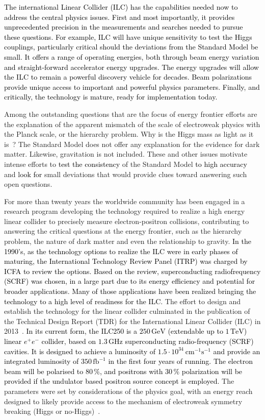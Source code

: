 \documentclass[%
 reprint,
 amsmath,amssymb,
 aps,
]{revtex4-1}
\newcommand{\juan}[1]{\textcolor{black}{{#1}}}
\newcommand{\jim}[1]{\textcolor{black}{#1}}
\begin{document}
\jim{The international Linear Collider (ILC) has the capabilities needed now to address the central physics issues. 
First and most importantly, it provides unprecedented precision 
in the measurements and searches needed to pursue these questions.  
For example, ILC will have unique sensitivity to test the 
Higgs couplings, particularly critical should the deviations 
from the Standard Model be small. It offers a range of 
operating energies, both through beam energy variation 
and straight-forward accelerator energy upgrades.  
The energy upgrades will allow the ILC to remain a powerful 
discovery vehicle for decades. Beam polarizations provide 
unique access to important and powerful physics parameters. 
Finally, and critically, the technology is mature, 
ready for implementation today.}

Among the outstanding questions that are the focus of energy frontier
efforts are the explanation of the apparent mismatch of the scale of
electroweak physics with the Planck scale, or the hierarchy problem.
Why is the Higgs mass as light as it is~?
The Standard Model does not offer any explanation for the evidence for dark matter.
Likewise, gravitation is not included.  These and other issues
motivate intense efforts to \juan{test the consistency} of the Standard Model \juan{to high accuracy}
and \juan{look for} small deviations that would provide clues toward answering such
open questions.

For more than twenty years the worldwide community has been engaged in a research
program developing the technology required to realize a high energy linear collider
to precisely measure electron-positron collisions, contributing to 
answering the critical questions at the energy frontier, such as the hierarchy problem,
the nature of dark matter and even the relationship to gravity.
\jim{In the 1990's, as the technology options to realize the ILC were in early phases of maturing, the International Technology Review Panel (ITRP) was charged by ICFA to review the options.  Based on the review, superconducting radiofrequency (SCRF) was chosen, in a large part due to its energy efficiency and potential for broader applications.  Many of those applications have been realized bringing the technology to a high level of readiness for the ILC.}
The effort to design and establish the technology for the linear collider 
culminated in the publication of the Technical Design Report (TDR)
for the International Linear Collider (ILC) in 2013~\cite{Behnke:2013xla}. 
\juan{  In its current form, the \jim{ILC250} is a $250\,{\mathrm{GeV}}$ (extendable up to $1\,{\mathrm{TeV}}$) linear $e^+e^-$ collider, based on $1.3\,{\mathrm{GHz}}$ superconducting radio-frequency (SCRF) cavities. It is designed to  achieve a luminosity of $1.5\cdot 10^{34}~{\mathrm{cm}}^{-1}{\mathrm{s}}^{-1}$ and provide an integrated luminosity of $350\,{\mathrm{fb}}^{-1}$ in the first four years of running. The electron beam will be polarised to $80\,\%$, and positrons with $30\,\%$ polarization will be provided if the undulator based positron source concept is employed.} The parameters were set by considerations of the physics goal,
with an energy reach designed to likely provide access to the mechanism of 
electroweak symmetry breaking (Higgs or no-Higgs)~\cite{Baer:2013cma}.
\end{document}
